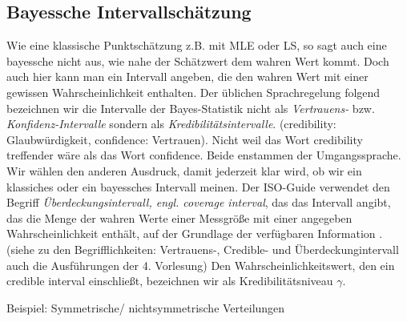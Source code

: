 \subsection{Bayessche Intervallschätzung}
Wie eine klassische Punktschätzung z.B. mit MLE oder LS, so sagt auch eine bayessche nicht aus, wie nahe der Schätzwert dem wahren Wert kommt. Doch auch hier kann man ein Intervall angeben, die 
den wahren Wert mit einer gewissen Wahrscheinlichkeit enthalten. Der üblichen Sprachregelung folgend bezeichnen wir die Intervalle der Bayes-Statistik nicht als \textit{Vertrauens-} bzw. \textit{Konfidenz-Intervalle} sondern als 
\textit{Kredibilitätsintervalle}. (credibility: Glaubwürdigkeit, confidence: Vertrauen). 
Nicht weil das Wort credibility treffender wäre als das Wort confidence. Beide enstammen der Umgangssprache. Wir wählen den anderen Ausdruck, damit jederzeit klar wird, ob wir ein klassiches oder ein bayessches Intervall meinen. 
Der ISO-Guide verwendet den Begriff 
\textit{Überdeckungsintervall, engl. coverage interval},
das das Intervall angibt, das die Menge der wahren Werte einer Messgröße
mit einer angegeben Wahrscheinlichkeit enthält, auf der Grundlage der
verfügbaren Information \cite{VIM08}. 
(siehe zu den Begrifflichkeiten: Vertrauens-, Credible- und Überdeckungintervall auch die Ausführungen der 4. Vorlesung)
Den Wahrscheinlichkeitswert, den ein credible interval einschließt, bezeichnen wir als Kredibilitätsniveau $\gamma.$

Beispiel: Symmetrische/ nichtsymmetrische Verteilungen

